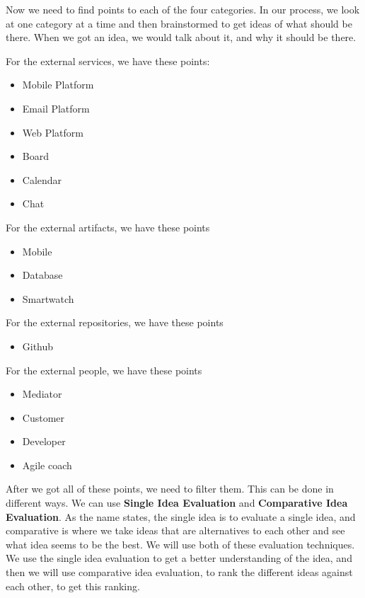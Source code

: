 Now we need to find points to each of the four categories.
In our process, we look at one category at a time and then brainstormed to get ideas of what should be there.
When we got an idea, we would talk about it, and why it should be there.

For the external services, we have these points:

\begin{itemize}
    \item Mobile Platform
    \item Email Platform
    \item Web Platform
    \item Board
    \item Calendar
    \item Chat 
\end{itemize}

For the external artifacts, we have these points

\begin{itemize}
    \item Mobile
    \item Database
    \item Smartwatch
\end{itemize}

For the external repositories, we have these points

\begin{itemize}
    \item Github
\end{itemize}

For the external people, we have these points

\begin{itemize}
    \item Mediator
    \item Customer
    \item Developer
    \item Agile coach
\end{itemize}

After we got all of these points, we need to filter them.
This can be done in different ways.
We can use \textbf{Single Idea Evaluation} and \textbf{Comparative Idea Evaluation}.
As the name states, the single idea is to evaluate a single idea, and comparative is where we take ideas that are alternatives to each other and see what idea seems to be the best.
We will use both of these evaluation techniques.
We use the single idea evaluation to get a better understanding of the idea, and then we will use comparative idea evaluation, to rank the different ideas against each other, to get this ranking.

